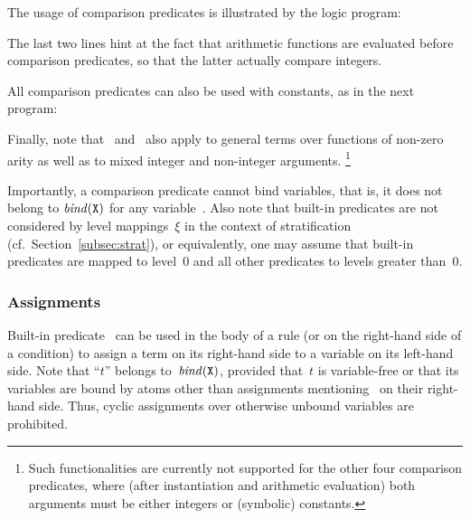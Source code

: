\begin{example}\label{ex:arith:pred}
The usage of comparison predicates is illustrated by the logic program:%
%

%
The last two lines hint at the fact that arithmetic functions are evaluated
before comparison predicates, so that the latter actually compare integers.

All comparison predicates can also be used with constants,
as in the next program:%
%

%
Finally, note that~\code{==} and~\code{!=} also apply to
general terms over functions of non-zero arity as well as to
mixed integer and non-integer arguments.%
\footnote{%
  Such functionalities are currently not supported for the other four
  comparison predicates,
  where (after instantiation and arithmetic evaluation)
  both arguments must be either integers or (symbolic) constants.
}
\eexample
\end{example}

Importantly, a comparison predicate cannot bind variables,
that is, it does not belong to $\binders{\var{X}}{r}$ for any variable~.
Also note that built-in predicates are not considered by level mappings~$\xi$
in the context of stratification (cf.\ Section~\ref{subsec:strat}), or equivalently,
one may assume that built-in predicates are mapped to level~$0$ and all other
predicates to levels greater than~$0$.


\subsubsection{Assignments}\label{subsec:gringo:assign}

Built-in predicate~\code{=} can be used in the body of a rule
(or on the right-hand side of a condition)
to assign a term on its right-hand side to a variable on its left-hand side.
Note that ``$t$'' belongs to~$\binders{\var{X}}{r}$,
provided that~$t$ is variable-free or that its variables are bound
by atoms other than assignments mentioning~ on their right-hand side.
Thus, cyclic assignments over otherwise unbound variables are prohibited.

